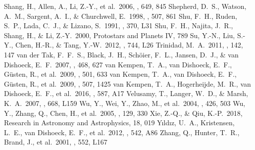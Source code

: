 \documentclass[twocolumn]{aastex62}
\begin{document}
\begin{thebibliography}{}
 Shang, H., Allen, A., Li, Z.-Y., et al.\ 2006, \apj, 649, 845 
 Shepherd, D.~S., Watson, A.~M., Sargent, A.~I., \& Churchwell, E.\ 1998, \apj, 507, 861 
 Shu, F.~H., Ruden, S.~P., Lada, C.~J., \& Lizano, S.\ 1991, \apjl, 370, L31
 Shu, F.~H., Najita, J.~R., Shang, H., \& Li, Z.-Y.\ 2000, Protostars and Planets IV, 789
 Su, Y.-N., Liu, S.-Y., Chen, H.-R., \& Tang, Y.-W.\ 2012, \apjl, 744, L26 
 Trinidad, M.~A.\ 2011, \aj, 142, 147 
 van der Tak, F.~F.~S., Black, J.~H., Sch{\"o}ier, F.~L., Jansen, D.~J., \& van Dishoeck, E.~F.\ 2007, \aap, 468, 627
 van Kempen, T.~A., van Dishoeck, E.~F., G{\"u}sten, R., et al.\ 2009, \aap, 501, 633 
 van Kempen, T.~A., van Dishoeck, E.~F., G{\"u}sten, R., et al.\ 2009, \aap, 507, 1425 
 van Kempen, T.~A., Hogerheijde, M.~R., van Dishoeck, E.~F., et al.\ 2016, \aap, 587, A17
 Velusamy, T., Langer, W.~D., \& Marsh, K.~A.\ 2007, \apjl, 668, L159 
 Wu, Y., Wei, Y., Zhao, M., et al.\ 2004, \aap, 426, 503
 Wu, Y., Zhang, Q., Chen, H., et al.\ 2005, \aj, 129, 330 
 Xie, Z.-Q., \& Qiu, K.-P.\ 2018, Research in Astronomy and Astrophysics, 18, 019
 Y{\i}ld{\i}z, U.~A., Kristensen, L.~E., van Dishoeck, E.~F., et al.\ 2012, \aap, 542, A86
 Zhang, Q., Hunter, T.~R., Brand, J., et al.\ 2001, \apjl, 552, L167 
\end{thebibliography}

\appendix
\end{document}
